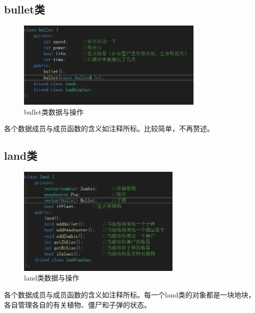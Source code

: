 \documentclass[12pt,a4paper,UTF8]{article}
\begin{document}
    \subsection{bullet类}
    \begin{figure}[H]
      \centering
    \includegraphics[width=0.8\textwidth]{figure/bullet.png}
    \caption{bullet类数据与操作}
    \end{figure}
    各个数据成员与成员函数的含义如注释所标。比较简单，不再赘述。

    \subsection{land类}
      \begin{figure}[H]
        \centering
      \includegraphics[width=0.7\textwidth]{figure/land.png}
      \caption{land类数据与操作}
      \end{figure}
      各个数据成员与成员函数的含义如注释所标。每一个land类的对象都是一块地块，各自管理各自的有关植物、僵尸和子弹的状态。
\end{document}
